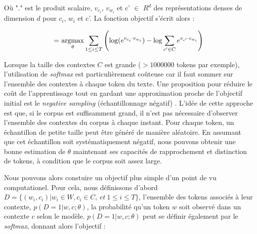 \documentclass[citation\_needed]{subfiles}
\begin{document}
Où "." est le produit scalaire, $v_{c_{i}}$, $v_{w_{i}}$ et c' $\in$ $R^{d}$ des représentations denses de dimension $d$ pour $c_{i}$, $w_{i}$ et c'. La fonction objectif s'écrit alors :

\begin{equation}\label{eq:skipgram-objective}
\begin{aligned}
= &\ \underset{\theta}{\operatorname{argmax}} \sum_{1 \leq i \leq T} \left( \log(e^{v_{c_{i}} \cdot v_{w_{i}}}) - \log \sum_{c' \in C} e^{v_{c'} \cdot c_{w_{i}}} \right) \\
\end{aligned}
\end{equation}

Lorsque la taille des contextes $C$ est grande ($>1000000$ tokens par exemple), l'utilisation de \textit{softmax} est particulièrement coûteuse car il faut sommer sur l'ensemble des contextes à chaque token du texte. Une proposition pour réduire le coût de l'apprentissage tout en gardant une approximation proche de l'objectif initial est le \textit{negative sampling} (échantillonnage négatif) \citep{mikolov2013distributed}. L'idée de cette approche est que, si le corpus est suffisamment grand, il n'est pas nécessaire d'observer l'ensemble des contextes du corpus à chaque instant. Pour chaque token, un échantillon de petite taille peut être généré de manière aléatoire. En assumant que cet échantillon soit systématiquement négatif, nous pouvons obtenir une bonne estimation de $\theta$ maintenant ses capacités de rapprochement et distinction de tokens, à condition que le corpus soit assez large.

Nous pouvons alors constuire un objectif plus simple d'un point de vu computationel. Pour cela, nous définissons d'abord $D=\{(w_{i},c_{i})| w_{i} \in W, c_{i} \in C,\ et\ 1 \leq i \leq T\}$, l'ensemble des tokens associés à leur contexte, $p(D = 1|w, c;\theta)$, la probabilité qu'un token $w$ soit observé dans un contexte $c$ selon le modèle. $p(D = 1|w, c;\theta)$ peut se définir également par le \emph{softmax}, donnant alors l'objectif :
\end{document}

